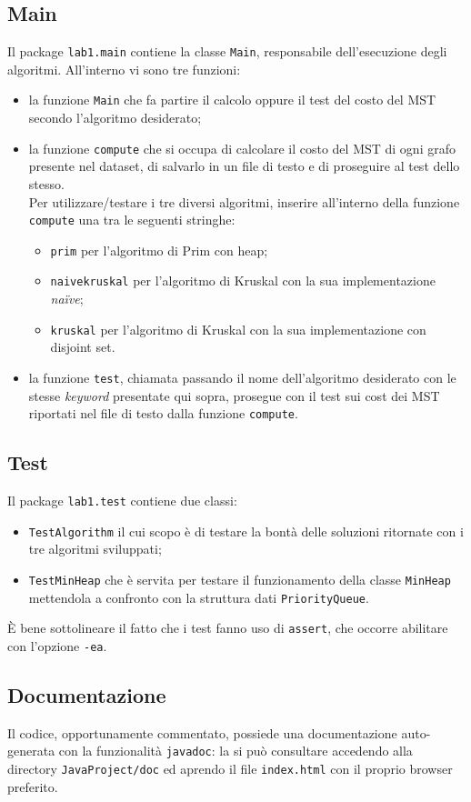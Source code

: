 \subsection{Main}
Il package \texttt{lab1.main} contiene la classe \texttt{Main}, responsabile dell'esecuzione degli algoritmi. All'interno vi sono tre funzioni:
\begin{itemize}
	\item la funzione \texttt{Main} che fa partire il calcolo oppure il test del costo del MST secondo l'algoritmo desiderato;
	\item la funzione \texttt{compute} che si occupa di calcolare il costo del MST di ogni grafo presente nel dataset, di salvarlo in un file di testo e di proseguire al test dello stesso.\\
	Per utilizzare/testare i tre diversi algoritmi, inserire all'interno della funzione \texttt{compute} una tra le seguenti stringhe:
	\begin{itemize}
		\item \texttt{prim} per l'algoritmo di Prim con heap;
		\item \texttt{naivekruskal} per l'algoritmo di Kruskal con la sua implementazione \emph{na\"ive};
		\item \texttt{kruskal} per l'algoritmo di Kruskal con la sua implementazione con disjoint set.
	\end{itemize}
    \item la funzione \texttt{test}, chiamata passando il nome dell'algoritmo desiderato con le stesse \emph{keyword} presentate qui sopra, prosegue con il test sui cost dei MST riportati nel file di testo dalla funzione \texttt{compute}.
\end{itemize}

\subsection{Test}
Il package \texttt{lab1.test} contiene due classi:
\begin{itemize}
	\item \texttt{TestAlgorithm} il cui scopo è di testare la bontà delle soluzioni ritornate con i tre algoritmi sviluppati;
	\item \texttt{TestMinHeap} che è servita per testare il funzionamento della classe \texttt{MinHeap} mettendola a confronto con la struttura dati \texttt{PriorityQueue}.
\end{itemize}
È bene sottolineare il fatto che i test fanno uso di \texttt{assert}, che occorre abilitare con l'opzione \texttt{-ea}.

\subsection{Documentazione}
Il codice, opportunamente commentato, possiede una documentazione auto-generata con la funzionalità \texttt{javadoc}: la si può consultare accedendo alla directory \texttt{JavaProject/doc} ed aprendo il file \texttt{index.html} con il proprio browser preferito. 